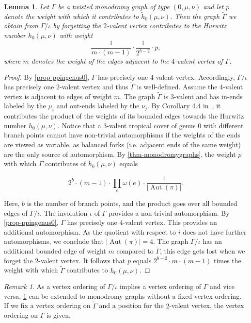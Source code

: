 \documentclass[10pt]{amsart}
\theoremstyle{plain}
\theoremstyle{definition}
\theoremstyle{definition}
\theoremstyle{plain}
\newtheorem{lemma}[lemma]{Lemma}
\theoremstyle{plain}
\theoremstyle{remark}
\newtheorem{rema}[rema]{Remark}
\theoremstyle{plain}
\theoremstyle{plain}
\DeclareMathOperator{\Aut}{Aut}
\begin{document}
\begin{lemma}\label{lem-compareweights}
Let $\Gamma$ be a twisted monodromy graph of type $(0,\mu,\nu)$ and let $p$ denote the weight with which it contributes to $\tilde{h}_0(\mu,\nu)$. 
Then the graph $\tilde{\Gamma}$ we obtain from $\Gamma/\iota$ by forgetting the $2$-valent vertex contributes to the Hurwitz number $h_0(\mu,\nu)$ with weight
$$\frac{1}{m\cdot(m-1)} \cdot \frac{1}{2^{b-2}}\cdot p,$$
where $m$ denotes the weight of the edges adjacent to the $4$-valent vertex of $\Gamma$.

\end{lemma}
\begin{proof}
By \cref{prop-ppingenus0}, $\Gamma$ has precisely one $4$-valent vertex. Accordingly, $\Gamma/\iota$ has precisely one $2$-valent vertex and thus $\tilde{\Gamma}$ is well-defined.
Assume the $4$-valent vertex is adjacent to edges of weight $m$.
The graph $\tilde{\Gamma}$ is $3$-valent and has in-ends labeled by the $\mu_i$ and out-ends labeled by the $\nu_j$. By Corollary 4.4 in~\cite{CJM10}, it contributes the product of the weights of its bounded edges towards the Hurwitz number $h_0(\mu,\nu)$. Notice that a $3$-valent tropical cover of genus $0$ with different branch points cannot have non-trivial automorphisms if the weights of the ends are viewed as variable, as balanced forks (i.e. adjacent ends of the same weight) are the only source of automorphism.
By \cref{thm-monodromygraphs}, the weight $p$ with which $\Gamma$ contributes of $\tilde{h}_0(\mu,\nu)$ equals 

$$2^{b}\cdot (m-1)\cdot\prod_e\omega(e)\cdot \frac{1}{|\Aut(\pi)|}.$$

Here, $b$ is the number of branch points, and the product goes over all bounded edges of $\Gamma/\iota$.
The involution $\iota$ of $\Gamma$ provides a non-trivial automorphism. By \cref{prop-ppingenus0}, $\Gamma$ has precisely one $4$-valent vertex. This provides an additional automorphism. As the quotient with respect to $i$ does not have further automorphisms, we conclude that $|\Aut(\pi)|=4$.
The graph $\Gamma/\iota$ has an additional bounded edge of weight $m$ compared to $\tilde{\Gamma}$, this edge gets lost when we forget the $2$-valent vertex.
It follows that $p$ equals
$2^{b-2}\cdot m \cdot (m-1)$ times the weight with which $\tilde{\Gamma}$ contributes to $h_0(\mu,\nu)$.
\end{proof}

\begin{rema}
As a vertex ordering of $\Gamma/\iota$ implies a vertex ordering of $\Gamma$ and vice versa, \cref{lem-compareweights} can be extended to monodromy graphs without a fixed vertex ordering. If we fix a vertex ordering on $\tilde{\Gamma}$ and a position for the $2$-valent vertex, the vertex ordering on $\Gamma$ is given.
\end{rema}
\end{document}
